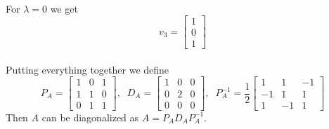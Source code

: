 \documentclass[letter]{article}
\newenvironment{menumerate}{\edef\backupindent{\the\parindent}
  \enumerate\setlength{\parindent}{\backupindent}}
  {\endenumerate}
\begin{document}
\begin{menumerate}
        \\For $\lambda = 0$ we get
         \begin{equation*}
            v_3 = \begin{bmatrix}
                1 \\ 0 \\ 1
            \end{bmatrix}
         \end{equation*}
        \\Putting everything together we define
         \begin{equation*}
            P_A = \begin{bmatrix}
                1 & 0 & 1 \\
                1 & 1 & 0 \\
                0 & 1 & 1
            \end{bmatrix}, \;\;
            D_A = \begin{bmatrix}
                1 & 0 & 0 \\
                0 & 2 & 0 \\
                0 & 0 & 0
            \end{bmatrix}, \;\;
            P_A^{-1} = \frac{1}{2}\begin{bmatrix}
                1 & 1 & -1 \\
                -1 & 1 & 1 \\
                1 & -1 & 1
            \end{bmatrix}
         \end{equation*}
         Then $A$ can be diagonalized as $A = P_A D_A P_A^{-1}$.


\end{menumerate}
\end{document}
